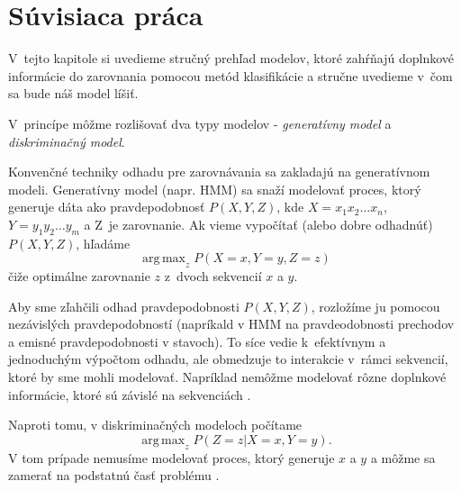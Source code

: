 \chapter{Súvisiaca práca}
\label{chap:other-work}

V~tejto kapitole si uvedieme stručný prehľad modelov, ktoré zahŕňajú doplnkové informácie do zarovnania pomocou metód klasifikácie a stručne uvedieme v~čom sa bude náš model líšiť.

V~princípe môžme rozlišovať dva typy modelov - \textit{generatívny model} a \textit{diskriminačný model}.

Konvenčné techniky odhadu pre zarovnávania sa zakladajú na generatívnom modeli. Generatívny model (napr. HMM) sa snaží modelovať proces, ktorý generuje dáta ako pravdepodobnosť $P(X,Y,Z)$, kde $X = x_1x_2\dots x_n$, $Y = y_1y_2\dots y_m$ a Z~je zarovnanie. Ak vieme vypočítať (alebo dobre odhadnúť) $P(X,Y,Z)$, hľadáme
$$\operatorname{ arg\,max}_z P(X = x,Y = y,Z = z)$$
čiže optimálne zarovnanie $z$ z~dvoch sekvencií $x$ a $y$.

Aby sme zľahčili odhad pravdepodobnosti $P(X,Y,Z)$, rozložíme ju pomocou nezávislých pravdepodobností (napríkald v HMM na pravdeodobnosti prechodov a emisné pravdepodobnosti v stavoch).
To síce vedie k~efektívnym a jednoduchým výpočtom odhadu, ale obmedzuje to interakcie v~rámci sekvencií, ktoré by sme mohli modelovať. Napríklad nemôžme modelovať rôzne doplnkové informácie, ktoré sú závislé na sekvenciách \cite{svmTrainingProteinsAlignment}.

Naproti tomu, v diskriminačných modeloch počítame
$$\operatorname{ arg\,max}_z P(Z = z|X = x,Y = y).$$
V tom prípade nemusíme modelovať proces, ktorý generuje $x$ a $y$ a môžme sa zamerať na podstatnú časť problému \cite{svmTrainingProteinsAlignment}.


